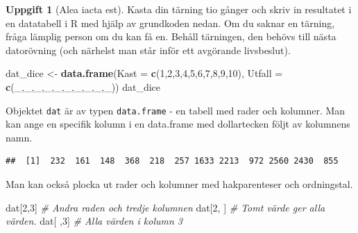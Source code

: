 \documentclass[
]{book}
\newenvironment{Shaded}{\begin{snugshade}}{\end{snugshade}}
\newcommand{\AttributeTok}[1]{\textcolor[rgb]{0.13,0.29,0.53}{#1}}
\newcommand{\CommentTok}[1]{\textcolor[rgb]{0.56,0.35,0.01}{\textit{#1}}}
\newcommand{\DecValTok}[1]{\textcolor[rgb]{0.00,0.00,0.81}{#1}}
\newcommand{\FunctionTok}[1]{\textcolor[rgb]{0.13,0.29,0.53}{\textbf{#1}}}
\newcommand{\NormalTok}[1]{#1}
\newcommand{\OtherTok}[1]{\textcolor[rgb]{0.56,0.35,0.01}{#1}}
\newcommand{\SpecialCharTok}[1]{\textcolor[rgb]{0.81,0.36,0.00}{\textbf{#1}}}
\theoremstyle{definition}
\theoremstyle{definition}
\theoremstyle{definition}
\newtheorem{exercise}{Uppgift}[chapter]
\theoremstyle{definition}
\theoremstyle{remark}
\begin{document}
\begin{exercise}[Alea iacta est]

Kasta din tärning tio gånger och skriv in resultatet i en datatabell i R med hjälp av grundkoden nedan. Om du saknar en tärning, fråga lämplig person om du kan få en. Behåll tärningen, den behövs till nästa datorövning (och närhelst man står inför ett avgörande livsbeslut).

\begin{Shaded}
\begin{Highlighting}[]
\NormalTok{dat\_dice }\OtherTok{\textless{}{-}} \FunctionTok{data.frame}\NormalTok{(}\AttributeTok{Kast =} \FunctionTok{c}\NormalTok{(}\DecValTok{1}\NormalTok{,}\DecValTok{2}\NormalTok{,}\DecValTok{3}\NormalTok{,}\DecValTok{4}\NormalTok{,}\DecValTok{5}\NormalTok{,}\DecValTok{6}\NormalTok{,}\DecValTok{7}\NormalTok{,}\DecValTok{8}\NormalTok{,}\DecValTok{9}\NormalTok{,}\DecValTok{10}\NormalTok{),}
                       \AttributeTok{Utfall =} \FunctionTok{c}\NormalTok{(\_,\_,\_,\_,\_,\_,\_,\_,\_,\_))}
\NormalTok{dat\_dice}
\end{Highlighting}
\end{Shaded}

\end{exercise}

Objektet \texttt{dat} är av typen \texttt{data.frame} - en tabell med rader och kolumner. Man kan ange en specifik kolumn i en data.frame med dollartecken följt av kolumnens namn.

\begin{Shaded}
\end{Shaded}

\begin{verbatim}
##  [1]  232  161  148  368  218  257 1633 2213  972 2560 2430  855
\end{verbatim}

Man kan också plocka ut rader och kolumner med hakparenteser och ordningstal.

\begin{Shaded}
\begin{Highlighting}[]
\NormalTok{dat[}\DecValTok{2}\NormalTok{,}\DecValTok{3}\NormalTok{]          }\CommentTok{\# Andra raden och tredje kolumnen}
\NormalTok{dat[}\DecValTok{2}\NormalTok{, ]          }\CommentTok{\# Tomt värde ger alla värden.}
\NormalTok{dat[ ,}\DecValTok{3}\NormalTok{]          }\CommentTok{\# Alla värden i kolumn 3}
\end{Highlighting}
\end{Shaded}
\end{document}
